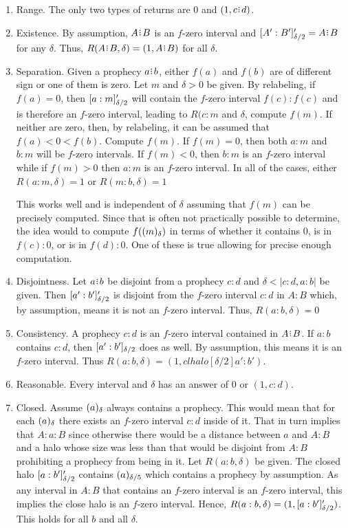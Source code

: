 \documentclass[12pt]{article}
\begin{document}
\begin{enumerate}
\item Range. The only two types of returns are $0$ and $(1, c \rint d)$. 

\item Existence. By assumption, $A \rint B$ is an $f$-zero interval and $\clhalo[\delta/2]{A':B'}' = A \rint B$ for any $\delta$. Thus, $R(A \rint B, \delta) = (1, A \rint B)$ for all $\delta$. 

\item Separation. Given a prophecy $a \rint b$, either $f(a)$ and $f(b)$ are of different sign or one of them is zero. Let $m$ and $\delta > 0$ be given. By relabeling, if $f(a) =0$, then $\clhalo[\delta/2]{a:m}'$ will contain the $f$-zero interval $f(c):f(c)$ and is therefore an $f$-zero interval, leading to $R(c:m$ and $\delta$, compute $f(m)$. If neither are zero, then, by relabeling, it can be assumed that  $f(a) < 0 < f(b)$. Compute $f(m)$. If $f(m) = 0$, then both $a:m$ and $b:m$ will be $f$-zero intervals. If $f(m) < 0$, then $b:m$ is an $f$-zero interval while if $f(m) > 0$ then $a:m$ is an $f$-zero interval. In all of the cases, either $R(a:m, \delta) =1$ or $R(m:b, \delta) =1$

This works well and is independent of $\delta$ assuming that $f(m)$ can be precisely computed. Since that is often not practically possible to determine, the idea would to compute $f(\halo{m})$ in terms of whether it contains $0$, is in $f(c):0$, or is in $f(d):0$. One of these is true allowing for precise enough computation. 

\item Disjointness. Let $a \rint b$ be disjoint from a prophecy $c:d$ and $\delta < |c:d, a:b|$ be given. Then $\clhalo[\delta/2]{a':b'}'$ is disjoint from the $f$-zero interval $c:d$ in $A:B$ which, by assumption, means it is not an $f$-zero interval. Thus, $R(a:b, \delta) = 0$

\item Consistency. A prophecy $c:d$ is an $f$-zero interval contained in $A \rint B$. If $a:b$ contains $c:d$, then $\clhalo[\delta/2]{a':b'}$ does as well. By assumption, this means it is an $f$-zero interval. Thus $R(a:b, \delta) = (1, clhalo[\delta/2]{a':b'})$.

\item Reasonable. Every interval and $\delta$ has an answer of $0$ or $(1, c : d)$.

\item Closed. Assume $\halo{a}$ always contains a prophecy. This would mean that for each $\halo{a}$ there exists an $f$-zero interval $c:d$ inside of it. That in turn implies that $A : a: B$ since otherwise there would be a distance between $a$ and $A:B$ and a halo whose size was less than that would be disjoint from $A:B$ prohibiting a prophecy from being in it. Let $R(a:b, \delta)$ be given. The closed halo $\clhalo[\delta/2]{a:b'}'$ contains $\halo[\delta/5]{a}$ which contains a prophecy by assumption. As any interval in $A:B$ that contains an $f$-zero interval is an $f$-zero interval, this implies the close halo is an $f$-zero interval. Hence, $R(a:b, \delta) = (1, \clhalo[\delta/2]{a:b'}') $. This holds for all $b$ and all $\delta$.


\end{enumerate}
\end{document}
